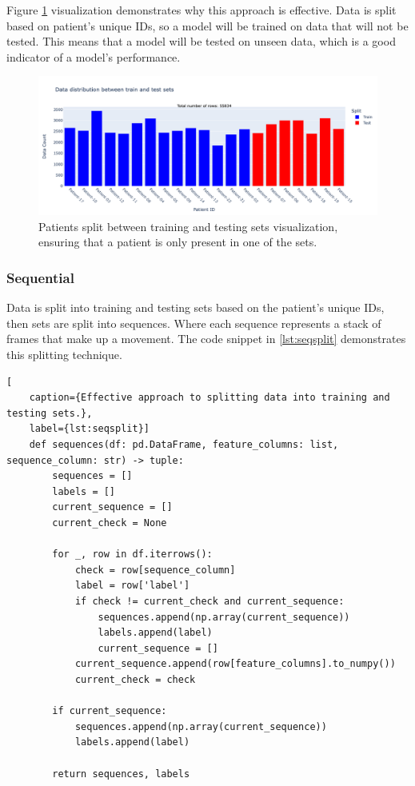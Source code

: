             Figure \ref{fig:goodsplit} visualization demonstrates why this approach is effective. Data is split based on patient's unique IDs, so a model will be trained on data that will not be tested. This means that a model will be tested on unseen data, which is a good indicator of a model's performance.

            \begin{figure}[H]
                \centering
                \includegraphics[width=1.0\textwidth]{../src/resources/plots/splits/good.png}
                \caption{
                    Patients split between training and testing sets visualization, ensuring that a patient is only present in one of the sets.
                }
                \label{fig:goodsplit}
            \end{figure}

    \newpage
            
            \subsubsection{Sequential} \label{sec:seqsplit}
            Data is split into training and testing sets based on the patient's unique IDs, then sets are split into sequences. Where each sequence represents a stack of frames that make up a movement. The code snippet in \ref{lst:seqsplit} demonstrates this splitting technique. 

\begin{lstlisting}[
    caption={Effective approach to splitting data into training and testing sets.}, 
    label={lst:seqsplit}]                
    def sequences(df: pd.DataFrame, feature_columns: list, sequence_column: str) -> tuple:
        sequences = []
        labels = []
        current_sequence = []
        current_check = None

        for _, row in df.iterrows():
            check = row[sequence_column]
            label = row['label']
            if check != current_check and current_sequence:
                sequences.append(np.array(current_sequence))
                labels.append(label)
                current_sequence = []
            current_sequence.append(row[feature_columns].to_numpy())
            current_check = check

        if current_sequence: 
            sequences.append(np.array(current_sequence))
            labels.append(label)

        return sequences, labels
\end{lstlisting}

